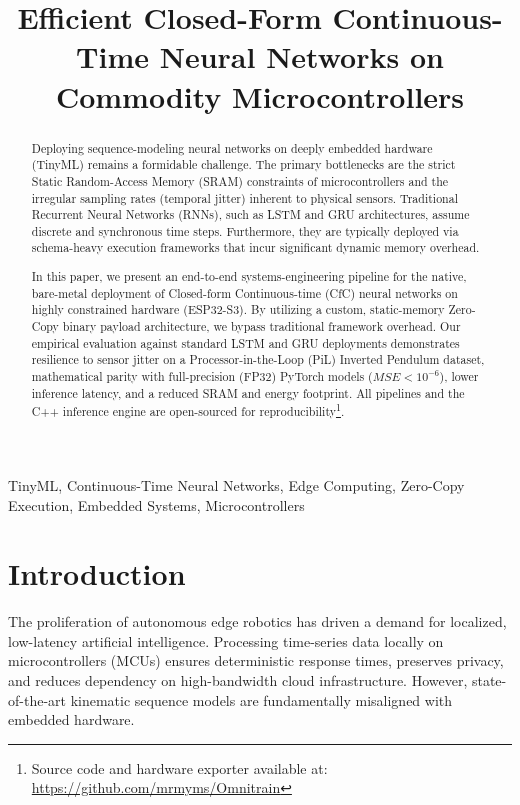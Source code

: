 \documentclass[conference]{IEEEtran}
\begin{document}
\title{Efficient Closed-Form Continuous-Time Neural Networks on Commodity Microcontrollers}

\author{
}

\maketitle

\begin{abstract}
Deploying sequence-modeling neural networks on deeply embedded hardware (TinyML) remains a formidable challenge. The primary bottlenecks are the strict Static Random-Access Memory (SRAM) constraints of microcontrollers and the irregular sampling rates (temporal jitter) inherent to physical sensors. Traditional Recurrent Neural Networks (RNNs), such as LSTM and GRU architectures, assume discrete and synchronous time steps. Furthermore, they are typically deployed via schema-heavy execution frameworks that incur significant dynamic memory overhead. 

In this paper, we present an end-to-end systems-engineering pipeline for the native, bare-metal deployment of Closed-form Continuous-time (CfC) neural networks on highly constrained hardware (ESP32-S3). By utilizing a custom, static-memory Zero-Copy binary payload architecture, we bypass traditional framework overhead. Our empirical evaluation against standard LSTM and GRU deployments demonstrates resilience to sensor jitter on a Processor-in-the-Loop (PiL) Inverted Pendulum dataset, mathematical parity with full-precision (FP32) PyTorch models ($MSE < 10^{-6}$), lower inference latency, and a reduced SRAM and energy footprint. All pipelines and the C++ inference engine are open-sourced for reproducibility\footnote{Source code and hardware exporter available at: \url{https://github.com/mrmyms/Omnitrain}}.
\end{abstract}

\begin{IEEEkeywords}
TinyML, Continuous-Time Neural Networks, Edge Computing, Zero-Copy Execution, Embedded Systems, Microcontrollers
\end{IEEEkeywords}

\section{Introduction}
The proliferation of autonomous edge robotics has driven a demand for localized, low-latency artificial intelligence. Processing time-series data locally on microcontrollers (MCUs) ensures deterministic response times, preserves privacy, and reduces dependency on high-bandwidth cloud infrastructure. However, state-of-the-art kinematic sequence models are fundamentally misaligned with embedded hardware.
\end{document}
